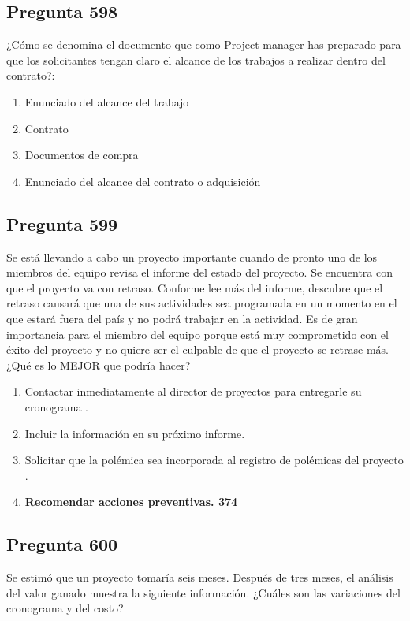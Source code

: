 \documentclass[11pt,a4paper]{article}
\begin{document}
\subsection*{Pregunta 598}
¿Cómo se denomina el documento que como Project manager has preparado para que los solicitantes tengan claro el alcance de los trabajos a realizar dentro del contrato?:

\begin{enumerate}[label=\alph*)]
  \item Enunciado del alcance del trabajo
  \item Contrato
  \item Documentos de compra
  \item Enunciado del alcance del contrato o adquisición
\end{enumerate}

\subsection*{Pregunta 599}
Se está llevando a cabo un proyecto importante cuando de pronto uno de los miembros del equipo revisa el informe del estado del proyecto. Se encuentra con que el proyecto va con retraso. Conforme lee más del informe, descubre que el retraso causará que una de sus actividades sea programada en un momento en el que estará fuera del país y no podrá trabajar en la actividad. Es de gran importancia para el miembro del equipo porque está muy comprometido con el éxito del proyecto y no quiere ser el culpable de que el proyecto se retrase más. ¿Qué es lo MEJOR que podría hacer?

\begin{enumerate}[label=\alph*)]
  \item Contactar inmediatamente al director de proyectos para entregarle su cronograma .
  \item Incluir la información en su próximo informe.
  \item Solicitar que la polémica sea incorporada al registro de polémicas del proyecto .
  \item \textbf{Recomendar acciones preventivas. 374}
\end{enumerate}

\subsection*{Pregunta 600}
Se estimó que un proyecto tomaría seis meses. Después de tres meses, el análisis del valor ganado muestra la siguiente información. ¿Cuáles son las variaciones del cronograma y del costo?
\end{document}
